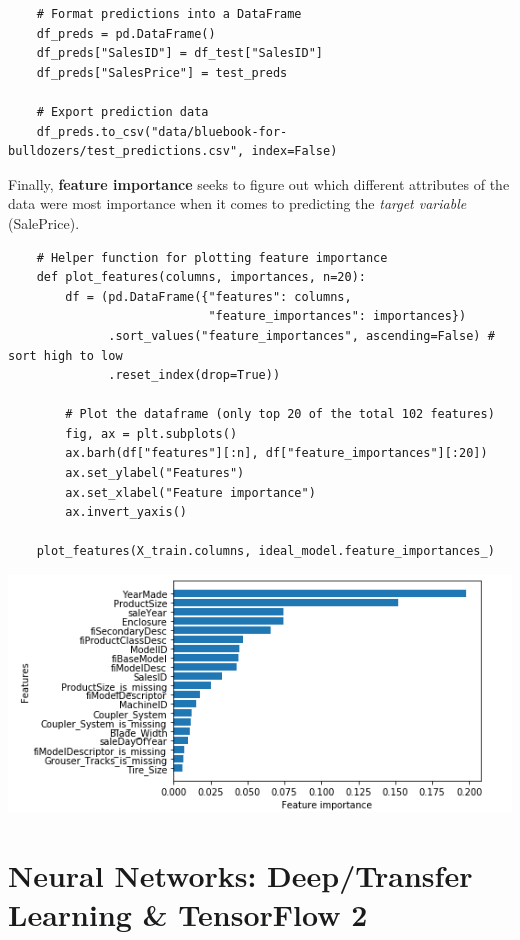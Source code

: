 \documentclass[11pt, a4paper]{article}
\begin{document}
\begin{spacing}{1.1}
\begin{lstlisting}
	# Format predictions into a DataFrame
	df_preds = pd.DataFrame()
	df_preds["SalesID"] = df_test["SalesID"]
	df_preds["SalesPrice"] = test_preds
	
	# Export prediction data
	df_preds.to_csv("data/bluebook-for-bulldozers/test_predictions.csv", index=False) \end{lstlisting} \vspace*{1mm}
	Finally, \textbf{feature importance} seeks to figure out which different attributes of the data were most importance when it comes to predicting the \textit{target variable} (SalePrice).
	\begin{lstlisting}
	# Helper function for plotting feature importance
	def plot_features(columns, importances, n=20):
		df = (pd.DataFrame({"features": columns,
		                    "feature_importances": importances})
		      .sort_values("feature_importances", ascending=False) # sort high to low
		      .reset_index(drop=True))
		
		# Plot the dataframe (only top 20 of the total 102 features)
		fig, ax = plt.subplots()
		ax.barh(df["features"][:n], df["feature_importances"][:20])
		ax.set_ylabel("Features")
		ax.set_xlabel("Feature importance")
		ax.invert_yaxis()
	
	plot_features(X_train.columns, ideal_model.feature_importances_) \end{lstlisting} \vspace*{1mm}
	\includegraphics[scale=1]{feat_im_mp2} \newpage

	\section{Neural Networks: Deep/Transfer Learning \& TensorFlow 2}

\end{spacing}
\end{document}

